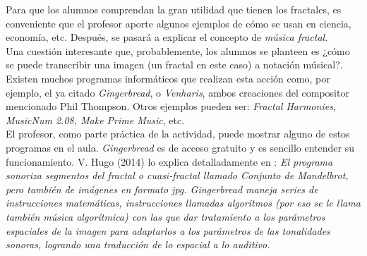 \documentclass[a4paper, openright, 11pt, titlepage]{report}
\theoremstyle{definition}\newtheorem{defin}[propo]{Definition}
\theoremstyle{definition}\newtheorem{obser}[propo]{Remark}
\theoremstyle{definition}\newtheorem{ejem}[propo]{Ejemplo}
\theoremstyle{definition}\newtheorem{algoritmo}[propo]{Algoritmo}
\begin{document}
Para que los alumnos comprendan la gran utilidad que tienen los fractales, es conveniente que el profesor aporte algunos ejemplos de cómo se usan en ciencia, economía, etc. Después, se pasará a explicar el concepto de \textit{música fractal}. \\
Una cuestión interesante que, probablemente, los alumnos se planteen es ¿cómo se puede transcribir una imagen (un fractal en este caso) a notación músical?. Existen muchos programas informáticos que realizan esta acción como, por ejemplo, el ya citado \textit{Gingerbread}, o \textit{Venharis}, ambos creaciones del compositor mencionado Phil Thompson. Otros ejemplos pueden ser: \textit{Fractal Harmonies, MusicNum 2.08, Make Prime Music}, etc.\\
El profesor, como parte práctica de la actividad, puede mostrar alguno de estos programas en el aula. \textit{Gingerbread} es de acceso gratuito y es sencillo entender su funcionamiento. V. Hugo (2014) lo explica detalladamente en \cite{gingerbread}: \textit{El programa sonoriza segmentos del fractal o cuasi-fractal llamado Conjunto de Mandelbrot, pero también de imágenes en formato jpg. Gingerbread maneja series de instrucciones matemáticas, instrucciones llamadas algoritmos (por eso se le llama también música algorítmica) con las que dar tratamiento a los parámetros espaciales de la imagen para adaptarlos a los parámetros de las tonalidades sonoras, logrando una traducción de lo espacial a lo auditivo.}
\end{document}
